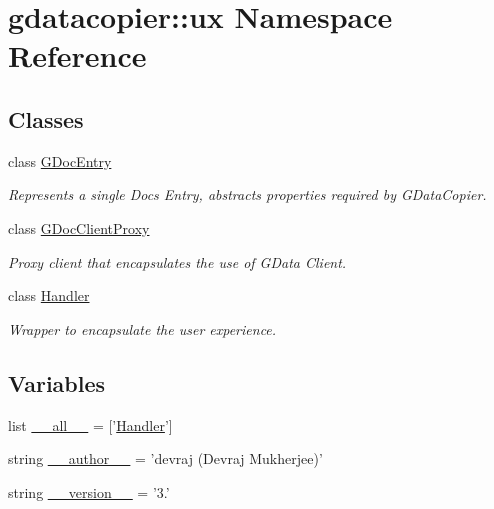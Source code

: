 \hypertarget{namespacegdatacopier_1_1ux}{\section{gdatacopier\-:\-:ux \-Namespace \-Reference}
\label{namespacegdatacopier_1_1ux}
}
\subsection*{\-Classes}
\begin{DoxyCompactItemize}
\item 
class \hyperlink{classgdatacopier_1_1ux_1_1_g_doc_entry}{\-G\-Doc\-Entry}
\begin{DoxyCompactList}\small\item\em \-Represents a single \-Docs \-Entry, abstracts properties required by \-G\-Data\-Copier. \end{DoxyCompactList}\item 
class \hyperlink{classgdatacopier_1_1ux_1_1_g_doc_client_proxy}{\-G\-Doc\-Client\-Proxy}
\begin{DoxyCompactList}\small\item\em \-Proxy client that encapsulates the use of \-G\-Data \-Client. \end{DoxyCompactList}\item 
class \hyperlink{classgdatacopier_1_1ux_1_1_handler}{\-Handler}
\begin{DoxyCompactList}\small\item\em \-Wrapper to encapsulate the user experience. \end{DoxyCompactList}\end{DoxyCompactItemize}
\subsection*{\-Variables}
\begin{DoxyCompactItemize}
\item 
list \hyperlink{namespacegdatacopier_1_1ux_a736d1639256447517e997966acbca29a}{\-\_\-\-\_\-all\-\_\-\-\_\-} = \mbox{[}'\hyperlink{classgdatacopier_1_1ux_1_1_handler}{\-Handler}'\mbox{]}
\item 
string \hyperlink{namespacegdatacopier_1_1ux_acbef417238cefac3b7c893c4293e851e}{\-\_\-\-\_\-author\-\_\-\-\_\-} = 'devraj (\-Devraj \-Mukherjee)'
\item 
string \hyperlink{namespacegdatacopier_1_1ux_a077784934fd74abb38c0d6f75e5df532}{\-\_\-\-\_\-version\-\_\-\-\_\-} = '3.'
\end{DoxyCompactItemize}


